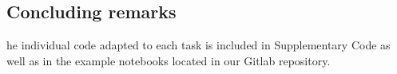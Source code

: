 \subsection{Concluding remarks}


he individual code adapted to each task is included in Supplementary Code as well as in the example notebooks located in our Gitlab repository.

